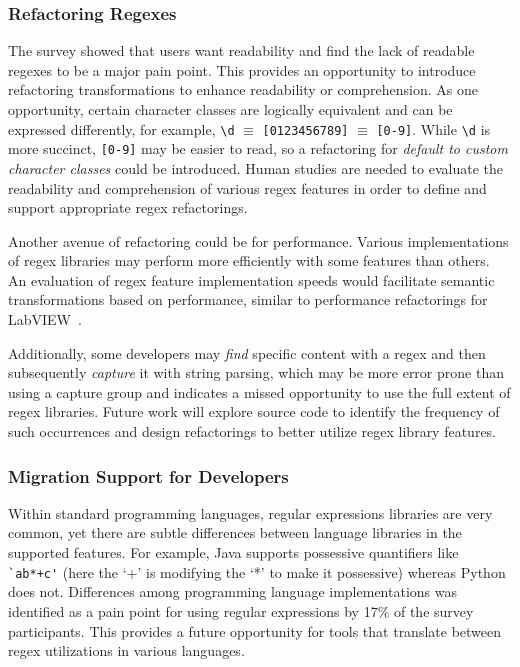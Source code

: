 \subsubsection{Refactoring Regexes}
The survey showed that users want readability and find the lack of readable regexes to be a major pain point.
This provides an opportunity to introduce refactoring transformations to enhance readability or comprehension.
As one opportunity, certain character classes are logically equivalent and can be expressed differently, for example, \verb!\d! $\equiv$ \verb![0123456789]! $\equiv$ \verb![0-9]!. While \verb!\d! is more succinct, \verb![0-9]! may be easier to read, so a refactoring for \emph{default to custom character classes} could be introduced.
Human studies are needed to evaluate the readability and comprehension of various regex features in order to define and support appropriate regex refactorings.

Another avenue of refactoring could be for performance. Various implementations of regex libraries may perform more efficiently with some features than others. An evaluation of regex feature implementation speeds would facilitate semantic transformations based on performance, similar to performance refactorings for LabVIEW~\cite{chambers2013smell, chambers2015impact}.

Additionally, some developers may  \emph{find} specific content with a regex  and then subsequently \emph{capture} it with string parsing, which may be more error prone than using a capture group and indicates a missed opportunity to use the full extent of regex libraries. Future work will explore source code to identify the frequency of such occurrences and design refactorings to better utilize regex library features.

\vspace{-2pt}
\subsubsection{Migration  Support for Developers}
Within standard programming languages, regular expressions libraries are very common, yet there are subtle  differences between language libraries in the supported features. For example, Java supports possessive quantifiers like \verb! `ab*+c'! (here the `+' is modifying the `*' to make it possessive) whereas Python does not. Differences among programming language implementations was identified as a pain point for using regular expressions by 17\% of the survey participants. This provides a future opportunity for tools that translate between regex utilizations in various languages.

